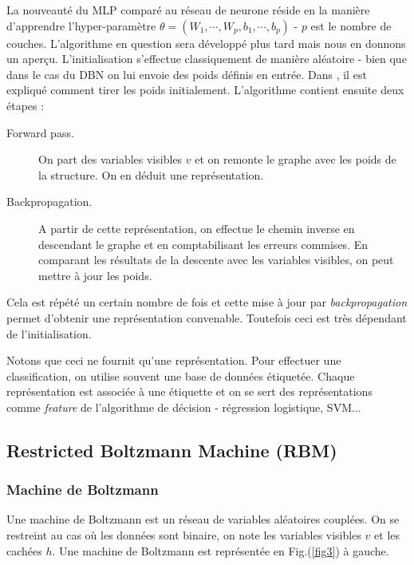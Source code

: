 \documentclass[10pt,a4paper]{article}
\begin{document}
La nouveauté du MLP comparé au réseau de neurone réside en la manière d'apprendre l'hyper-paramètre $\theta = (W_1, \cdots, W_p, b_1, \cdots, b_p)$ - $p$ est le nombre de couches. L'algorithme en question sera développé plus tard mais nous en donnons un aperçu. L'initialisation s'effectue classiquement de manière aléatoire - bien que dans le cas du DBN on lui envoie des poids définis en entrée. Dans \cite{GlorotAISTATS2010}, il est expliqué comment tirer les poids initialement. L'algorithme contient ensuite deux étapes :
\begin{description}
\item[Forward pass. ]On part des variables visibles $v$ et on remonte le graphe avec les poids de la structure. On en déduit une représentation.

\item[Backpropagation. ]A partir de cette représentation, on effectue le chemin inverse en descendant le graphe et en comptabilisant les erreurs commises. En comparant les résultats de la descente avec les variables visibles, on peut mettre à jour les poids.
\end{description}
Cela est répété un certain nombre de fois et cette mise à jour par \emph{backpropagation} permet d'obtenir une représentation convenable. Toutefois ceci est très dépendant de l'initialisation. 

Notons que ceci ne fournit qu'une représentation. Pour effectuer une classification, on utilise souvent une base de données étiquetée. Chaque représentation est associée à une étiquette et on se sert des représentations comme \emph{feature} de l'algorithme de décision - régression logistique, SVM...



\subsection{Restricted Boltzmann Machine (RBM)}

\subsubsection{Machine de Boltzmann}

Une machine de Boltzmann est un réseau de variables aléatoires couplées. On se restreint au cas où les données sont binaire, on note les variables visibles $v$ et les cachées $h$. Une machine de Boltzmann est représentée en Fig.(\ref{fig3}) à gauche.
\end{document}
